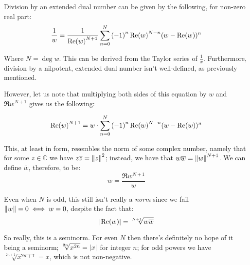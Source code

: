 \begin{theorem}
    Division by an extended dual number can be given by the following, for non-zero real part:
    $$
        \frac{1}{w}=\frac{1}{\Re{w}^{N+1}}\sum_{n=0}^{N}{\paren*{-1}^n\Re{w}^{N-n}(w-\Re{w})^n}
    $$

    Where $N=\deg{w}$. This can be derived from the Taylor series of $\frac{1}{x}$. Furthermore, division by a nilpotent, extended dual number isn't well-defined, as previously mentioned.

    However, let us note that multiplying both sides of this equation by $w$ and $\Re{w}^{N+1}$ gives us the following:

    $$
        \Re{w}^{N+1}=w\cdot\sum_{n=0}^{N}{\paren*{-1}^n\Re{w}^{N-n}(w-\Re{w})^n}
    $$

    This, at least in form, resembles the norm of some complex number, namely that for some $z\in\mathbb{C}$ we have $z\overline{z}=\norm{z}^2$; instead, we have that $w\overline{w}=\norm{w}^{N+1}$. We can define $\overline{w}$, therefore, to be:
    $$
        \overline{w}=\frac{\Re{w}^{N+1}}{w}
    $$

    Even when $N$ is odd, this still isn't really a \textit{norm} since we fail $\norm{w}=0\iff w=0$, despite the fact that:
    $$
        \abs{\Re{w}}=\sqrt[N+1]{w\overline{w}}
    $$

    So really, this is a seminorm. For even $N$ then there's definitely no hope of it being a seminorm; $\sqrt[2n]{x^{2n}}=\abs{x}$ for integer $n$; for odd powers we have $\sqrt[2n+1]{x^{2n+1}}=x$, which is not non-negative\footnotemark.

\end{theorem}

\newpage
